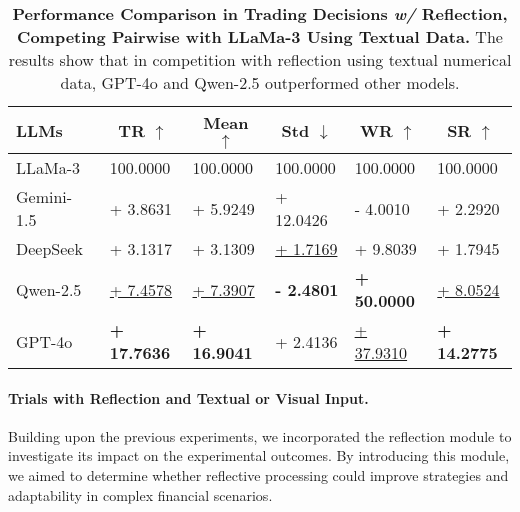\begin{table*}
	\centering
	\footnotesize
	\setlength{\tabcolsep}{12pt}
	\begin{tabular}{llllll}
	\toprule[1.1pt]
	LLMs & \multicolumn{1}{c}{TR $\uparrow$} & \multicolumn{1}{c}{Mean $\uparrow$} & \multicolumn{1}{c}{Std $\downarrow$} & \multicolumn{1}{c}{WR $\uparrow$} & \multicolumn{1}{c}{SR $\uparrow$} \\
	\midrule
	LLaMa-3~\citep{LLaMa3} & 100.0000 & 100.0000 & 100.0000 & 100.0000 & 100.0000 \\
	Gemini-1.5~\citep{Gemini1.5} & + 3.8631 & + 5.9249 & + 12.0426 & - 4.0010 & + 2.2920 \\
 	DeepSeek~\citep{DeepSeek3v} & + 3.1317 & + 3.1309 & \underline{+ 1.7169} & + 9.8039 & + 1.7945 \\
	Qwen-2.5~\citep{qwen2.5} & \underline{+ 7.4578} & \underline{+ 7.3907} & \textbf{- 2.4801} & \textbf{+ 50.0000} & \underline{+ 8.0524} \\
	GPT-4o~\citep{GPT4o} & \textbf{+ 17.7636} & \textbf{+ 16.9041} & + 2.4136 & \underline{+ 37.9310} & \textbf{+ 14.2775} \\
	\bottomrule[1.1pt]
	\end{tabular}
	\caption{\textbf{Performance Comparison in Trading Decisions \textit{w/} Reflection, Competing Pairwise with LLaMa-3 Using Textual Data.} The results show that in competition with reflection using textual numerical data, GPT-4o and Qwen-2.5 outperformed other models.}
	\label{ablation_experiment_LLMs}
	\vspace{-3pt}
\end{table*}

\vspace{-3pt}

\paragraph{Trials with Reflection and Textual or Visual Input.}

Building upon the previous experiments, we incorporated the reflection module to investigate its impact on the experimental outcomes. By introducing this module, we aimed to determine whether reflective processing could improve strategies and adaptability in complex financial scenarios.

